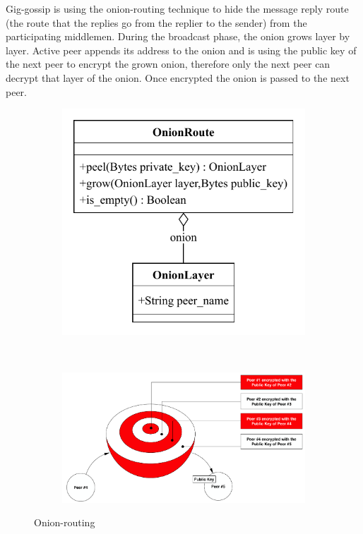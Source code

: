 \documentclass{article}
\begin{document}
Gig-gossip is using the onion-routing technique to hide the message reply route (the route that the replies go from the replier to the sender) from the participating middlemen. During the broadcast phase, the onion grows layer by layer. Active peer appends its address to the onion and is using the public key of the next peer to encrypt the grown onion, therefore only the next peer can decrypt that layer of the onion. Once encrypted the onion is passed to the next peer.

\begin{figure}[t!]
    \centering 
    \begin{subfigure}[t]{0.3\textwidth}
		\centering
		\includegraphics[scale=0.7]{OnionRoute.pdf}
	\end{subfigure}%
    ~ 
    \begin{subfigure}[t]{0.7\textwidth}
		\centering
		\includegraphics[scale=0.35]{onion.pdf}
	\end{subfigure}
    \caption{Onion-routing}
	\label{fig:fr:onionrouting}
\end{figure}
\end{document}

